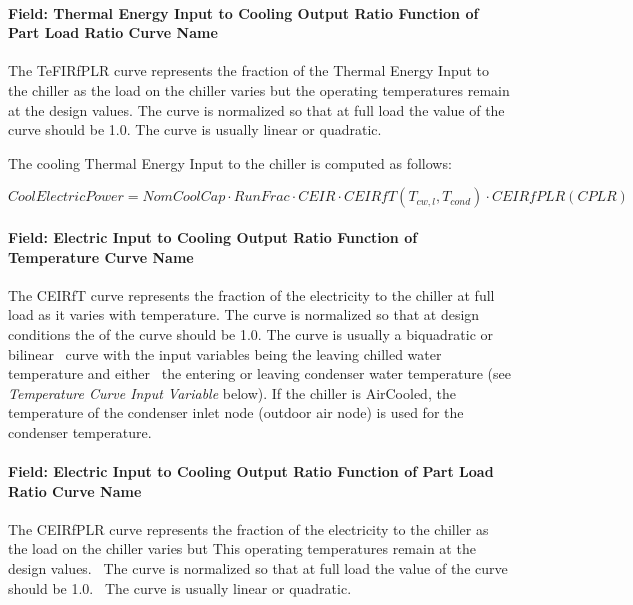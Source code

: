 \paragraph{Field: Thermal Energy Input to Cooling Output Ratio Function of Part Load Ratio Curve Name}\label{field-thermal-energy-input-to-cooling-output-ratio-function-of-part-load-ratio-curve-name}

The TeFIRfPLR curve represents the fraction of the Thermal Energy Input to the chiller as the load on the chiller varies but the operating temperatures remain at the design values. The curve is normalized so that at full load the value of the curve should be 1.0. The curve is usually linear or quadratic.

The cooling Thermal Energy Input to the chiller is computed as follows:

\begin{equation}
    CoolElectricPower = NomCoolCap \cdot RunFrac \cdot CEIR \cdot CEIRfT\left( {{T_{cw,l}},{T_{cond}}} \right) \cdot CEIRfPLR(CPLR)
\end{equation}

\paragraph{Field: Electric Input to Cooling Output Ratio Function of Temperature Curve Name}\label{field-electric-input-to-cooling-output-ratio-function-of-temperature-curve-name-3}

The CEIRfT curve represents the fraction of the electricity to the chiller at full load as it varies with temperature. The curve is normalized so that at design conditions the of the curve should be 1.0. The curve is usually a biquadratic or bilinear~ curve with the input variables being the leaving chilled water temperature and either~ the entering or leaving condenser water temperature (see \emph{Temperature Curve Input Variable} below). If the chiller is AirCooled, the temperature of the condenser inlet node (outdoor air node) is used for the condenser temperature.

\paragraph{Field: Electric Input to Cooling Output Ratio Function of Part Load Ratio Curve Name}\label{field-electric-input-to-cooling-output-ratio-function-of-part-load-ratio-curve-name-3}

The CEIRfPLR curve represents the fraction of the electricity to the chiller as the load on the chiller varies but This operating temperatures remain at the design values.~ The curve is normalized so that at full load the value of the curve should be 1.0.~ The curve is usually linear or quadratic.

